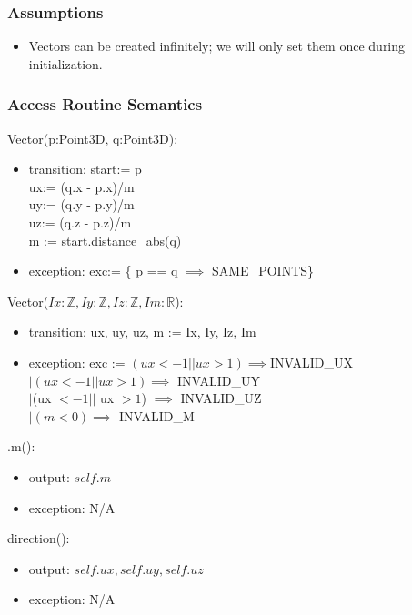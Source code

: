 \documentclass[12pt, titlepage]{article}
\begin{document}
\subsubsection{Assumptions}
\begin{itemize}
	\item Vectors can be created infinitely; we will only set them once during 
	initialization.			
\end{itemize}

\subsubsection{Access Routine Semantics}
\noindent Vector(p:Point3D, q:Point3D):
\begin{itemize}
	\item transition: start:= p\\
	ux:= (q.x - p.x)/m \\
	uy:= (q.y - p.y)/m \\
	uz:= (q.z - p.z)/m \\
	m := start.distance\_abs(q)\\
	\item exception: exc:= \{ p == q $\implies$ SAME\_POINTS\}
\end{itemize}

\noindent Vector($Ix: \mathbb{Z}, Iy: \mathbb{Z}, Iz: \mathbb{Z}, Im: 
\mathbb{R} 
$):
\begin{itemize}
	\item transition: ux, uy, uz, m := Ix, Iy, Iz, Im
	\item exception: exc := $(ux < -1 || ux > 1) \implies $INVALID\_UX \\
	$ | (ux < -1 || ux > 1) \implies$  INVALID\_UY \\ $| $(ux $< -1 ||$ ux $> 
	1$) $\implies $ INVALID\_UZ \\ $| (m < 0) \implies$ INVALID\_M
\end{itemize}

\noindent .m():
\begin{itemize}
	\item output: $self.m$
	\item exception: N/A
\end{itemize}

\noindent direction():
\begin{itemize}
	\item output: $self.ux, self.uy, self.uz$
	\item exception: N/A
\end{itemize}
\end{document}
